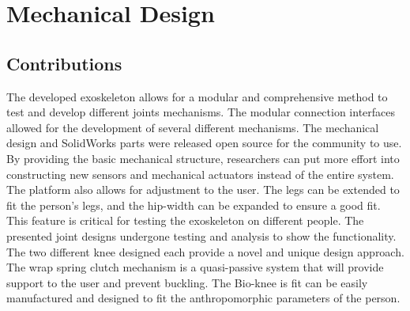 
\chapter{Mechanical Design}











\section{Contributions}

The developed exoskeleton allows for a modular and comprehensive method to test and develop different joints mechanisms. The modular connection interfaces allowed for the development of several different mechanisms. The mechanical design and SolidWorks parts were released open source for the community to use. By providing the basic mechanical structure, researchers can put more effort into constructing new sensors and mechanical actuators instead of the entire system. The platform also allows for adjustment to the user. The legs can be extended to fit the person's legs, and the hip-width can be expanded to ensure a good fit. This feature is critical for testing the exoskeleton on different people. The presented joint designs undergone testing and analysis to show the functionality. The two different knee designed each provide a novel and unique design approach. The wrap spring clutch mechanism is a quasi-passive system that will provide support to the user and prevent buckling. The Bio-knee is fit can be easily manufactured and designed to fit the anthropomorphic parameters of the person. 

